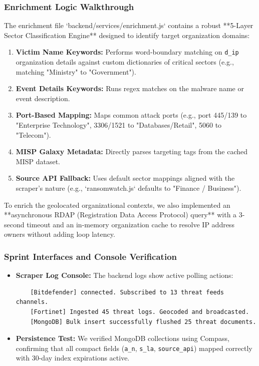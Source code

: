 \subsubsection{Enrichment Logic Walkthrough}
The enrichment file `backend/services/enrichment.js` contains a robust **5-Layer Sector Classification Engine** designed to identify target organization domains:
\begin{enumerate}
    \item \textbf{Victim Name Keywords:} Performs word-boundary matching on \texttt{d\_ip} organization details against custom dictionaries of critical sectors (e.g., matching "Ministry" to "Government").
    \item \textbf{Event Details Keywords:} Runs regex matches on the malware name or event description.
    \item \textbf{Port-Based Mapping:} Maps common attack ports (e.g., port 445/139 to "Enterprise Technology", 3306/1521 to "Databases/Retail", 5060 to "Telecom").
    \item \textbf{MISP Galaxy Metadata:} Directly parses targeting tags from the cached MISP dataset.
    \item \textbf{Source API Fallback:} Uses default sector mappings aligned with the scraper's nature (e.g., `ransomwatch.js` defaults to "Finance / Business").
\end{enumerate}

To enrich the geolocated organizational contexts, we also implemented an **asynchronous RDAP (Registration Data Access Protocol) query** with a 3-second timeout and an in-memory organization cache to resolve IP address owners without adding loop latency.

\subsubsection{Sprint Interfaces and Console Verification}
\begin{itemize}
    \item \textbf{Scraper Log Console:} The backend logs show active polling actions:
    \begin{verbatim}
    [Bitdefender] connected. Subscribed to 13 threat feeds channels.
    [Fortinet] Ingested 45 threat logs. Geocoded and broadcasted.
    [MongoDB] Bulk insert successfully flushed 25 threat documents.
    \end{verbatim}
    \item \textbf{Persistence Test:} We verified MongoDB collections using Compass, confirming that all compact fields (\texttt{a\_n}, \texttt{s\_la}, \texttt{source\_api}) mapped correctly with 30-day index expirations active.
\end{itemize}

